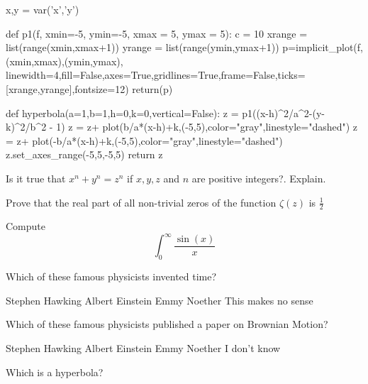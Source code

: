 \documentclass{exam}
\begin{document}
\begin{center}
\end{center}

\vspace{5mm}

\vspace{5mm}

\begin{sagesilent}
	x,y = var('x','y')

	def p1(f, xmin=-5, ymin=-5, xmax = 5, ymax = 5):
		  c = 10
		  xrange = list(range(xmin,xmax+1))
		  yrange = list(range(ymin,ymax+1))
		  p=implicit_plot(f,(xmin,xmax),(ymin,ymax),
			linewidth=4,fill=False,axes=True,gridlines=True,frame=False,ticks=[xrange,yrange],fontsize=12)
		  return(p)

	def hyperbola(a=1,b=1,h=0,k=0,vertical=False):
		  z = p1((x-h)^2/a^2-(y-k)^2/b^2 - 1)
		  z = z+ plot(b/a*(x-h)+k,(-5,5),color="gray",linestyle="dashed")
		  z = z+ plot(-b/a*(x-h)+k,(-5,5),color="gray",linestyle="dashed")
		  z.set_axes_range(-5,5,-5,5)
		  return z
\end{sagesilent}


\begin{questions}
\question Is it true that \(x^n + y^n = z^n\) if \(x,y,z\) and \(n\) are
positive integers?. Explain.

\question Prove that the real part of all non-trivial zeros of the function
\(\zeta(z)\) is \(\frac{1}{2}\)

\question Compute \[\int_{0}^{\infty} \frac{\sin(x)}{x}\]

\question Which of these famous physicists invented time?

\begin{choices}
 \CorrectChoice Stephen Hawking
 \choice Albert Einstein
 \choice Emmy Noether
 \choice This makes no sense
\end{choices}

\question Which of these famous physicists published a paper on Brownian Motion?

\begin{checkboxes}
 \choice Stephen Hawking
 \choice Albert Einstein
 \choice Emmy Noether
 \choice I don't know
\end{checkboxes}

\question Which is a hyperbola?

\begin{oneparchoices}
	\choice {}
	\choice {}
\	\choice {}
\end{oneparchoices}

\end{questions}
\end{document}
